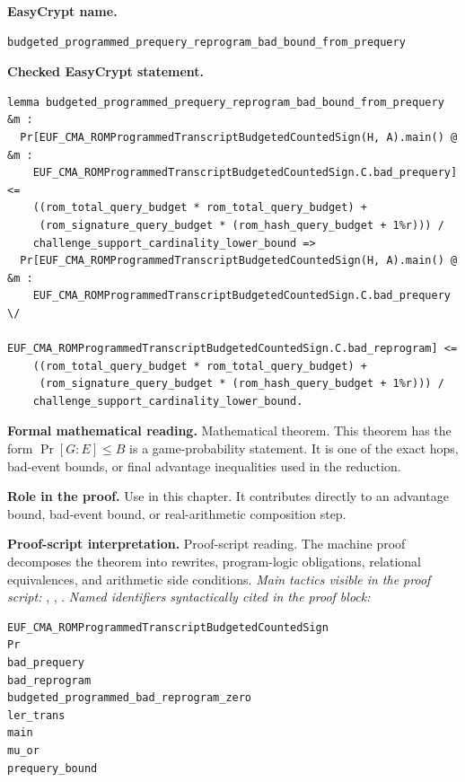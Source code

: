 \begin{formaltheorem}
\noindent\textbf{EasyCrypt name.}
\begin{lstlisting}[language=EasyCrypt,basicstyle=\ttfamily\scriptsize]
budgeted_programmed_prequery_reprogram_bad_bound_from_prequery
\end{lstlisting}
\noindent\textbf{Checked EasyCrypt statement.}
\begin{lstlisting}[language=EasyCrypt,basicstyle=\ttfamily\scriptsize]
lemma budgeted_programmed_prequery_reprogram_bad_bound_from_prequery &m :
  Pr[EUF_CMA_ROMProgrammedTranscriptBudgetedCountedSign(H, A).main() @ &m :
    EUF_CMA_ROMProgrammedTranscriptBudgetedCountedSign.C.bad_prequery] <=
    ((rom_total_query_budget * rom_total_query_budget) +
     (rom_signature_query_budget * (rom_hash_query_budget + 1%r))) /
    challenge_support_cardinality_lower_bound =>
  Pr[EUF_CMA_ROMProgrammedTranscriptBudgetedCountedSign(H, A).main() @ &m :
    EUF_CMA_ROMProgrammedTranscriptBudgetedCountedSign.C.bad_prequery \/
    EUF_CMA_ROMProgrammedTranscriptBudgetedCountedSign.C.bad_reprogram] <=
    ((rom_total_query_budget * rom_total_query_budget) +
     (rom_signature_query_budget * (rom_hash_query_budget + 1%r))) /
    challenge_support_cardinality_lower_bound.
\end{lstlisting}
\noindent\textbf{Formal mathematical reading.}
Mathematical theorem. This theorem has the form \(\Pr[G:E] \le B\) is a game-probability statement.  It is one of the exact hops, bad-event bounds, or final advantage inequalities used in the reduction.

\noindent\textbf{Role in the proof.}
Use in this chapter. It contributes directly to an advantage bound, bad-event bound, or real-arithmetic composition step.

\noindent\textbf{Proof-script interpretation.}
Proof-script reading. The machine proof decomposes the theorem into rewrites, program-logic obligations, relational equivalences, and arithmetic side conditions.
\emph{Main tactics visible in the proof script:} , , .
\emph{Named identifiers syntactically cited in the proof block:}
\begin{lstlisting}[language=EasyCrypt,basicstyle=\ttfamily\scriptsize]
EUF_CMA_ROMProgrammedTranscriptBudgetedCountedSign
Pr
bad_prequery
bad_reprogram
budgeted_programmed_bad_reprogram_zero
ler_trans
main
mu_or
prequery_bound
\end{lstlisting}

\end{formaltheorem}

